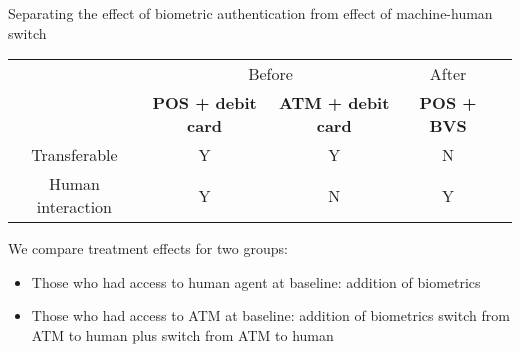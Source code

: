\documentclass[9pt,english,aspectratio=169,xcolor=table,handout]{beamer}
\begin{document}



\begin{frame}{Separating the effect of biometric authentication from effect of 
	machine-human switch}
	
\begin{table}[Changes in payment system varied]
\begin{tabular}{ccccc}
 & \multicolumn{2}{c}{Before} & After  \\
 & \textbf{POS + debit card} & \textbf{ATM + debit card} & \textbf{POS + BVS} \\
Transferable & Y & Y & N  \\
Human interaction & Y & N & Y
\end{tabular}
\end{table}
\pause

We compare treatment effects for two groups:
		\begin{itemize}
			\item Those who had access to human agent at baseline: addition of 
			biometrics 
			\item Those who had access to ATM at baseline:  addition of biometrics switch from ATM to human plus switch from ATM to human 
		\end{itemize} 
\end{frame}
\end{document}
